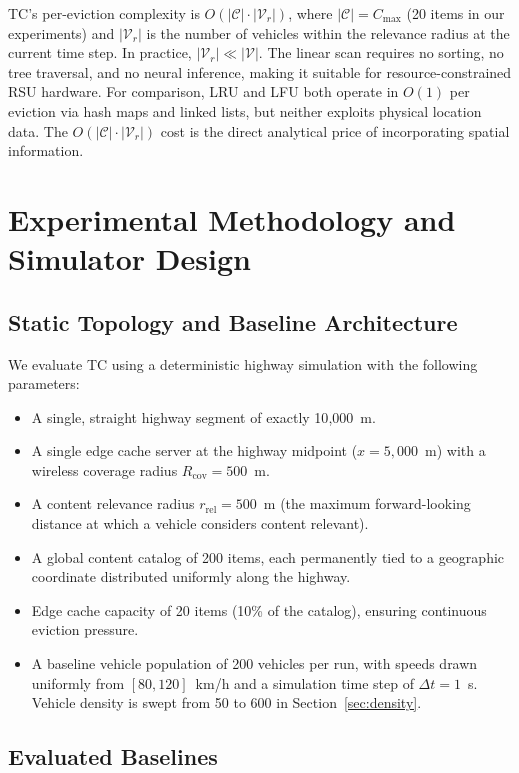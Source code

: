 \documentclass[preprint,12pt]{elsarticle}
\begin{document}
	TC's per-eviction complexity is $O(|\mathcal{C}| \cdot |\mathcal{V}_r|)$, where $|\mathcal{C}| = C_\text{max}$ (20 items in our experiments) and $|\mathcal{V}_r|$ is the number of vehicles within the relevance radius at the current time step. In practice, $|\mathcal{V}_r| \ll |\mathcal{V}|$. The linear scan requires no sorting, no tree traversal, and no neural inference, making it suitable for resource-constrained RSU hardware. For comparison, LRU and LFU both operate in $O(1)$ per eviction via hash maps and linked lists, but neither exploits physical location data. The $O(|\mathcal{C}| \cdot |\mathcal{V}_r|)$ cost is the direct analytical price of incorporating spatial information.
	
	\section{Experimental Methodology and Simulator Design}
	\label{sec:setup}
	
	\subsection{Static Topology and Baseline Architecture}
	

	We evaluate TC using a deterministic highway simulation with the following parameters:
	\begin{itemize}
		\item A single, straight highway segment of exactly 10{,}000~m.
		\item A single edge cache server at the highway midpoint ($x = 5{,}000$~m) with a wireless coverage radius $R_\text{cov} = 500$~m.
		\item A content relevance radius $r_\text{rel} = 500$~m (the maximum forward-looking distance at which a vehicle considers content relevant).
		\item A global content catalog of 200 items, each permanently tied to a geographic coordinate distributed uniformly along the highway.
		\item Edge cache capacity of 20 items (10\% of the catalog), ensuring continuous eviction pressure.
		\item A baseline vehicle population of 200 vehicles per run, with speeds drawn uniformly from $[80, 120]$~km/h and a simulation time step of $\Delta t = 1$~s. Vehicle density is swept from 50 to 600 in Section~\ref{sec:density}.
	\end{itemize}
	
	\subsection{Evaluated Baselines}
	
\end{document}
